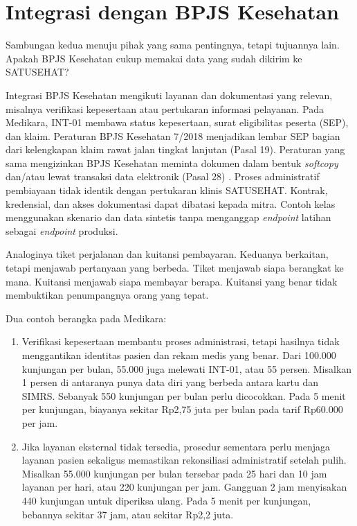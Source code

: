 \section{Integrasi dengan BPJS Kesehatan}

Sambungan kedua menuju pihak yang sama pentingnya, tetapi tujuannya lain. Apakah BPJS Kesehatan cukup memakai data
yang sudah dikirim ke SATUSEHAT?

Integrasi BPJS Kesehatan mengikuti layanan dan dokumentasi yang relevan, misalnya verifikasi kepesertaan atau
pertukaran informasi pelayanan. Pada Medikara, INT-01 membawa status kepesertaan, surat eligibilitas peserta (SEP),
dan klaim. Peraturan BPJS Kesehatan 7/2018 menjadikan lembar SEP bagian dari kelengkapan klaim rawat jalan tingkat
lanjutan (Pasal 19). Peraturan yang sama mengizinkan BPJS Kesehatan meminta dokumen dalam bentuk \textit{softcopy}
dan/atau lewat transaksi data elektronik (Pasal 28) \cite{c07-perban7-2018}. Proses administratif pembiayaan tidak
identik dengan pertukaran klinis SATUSEHAT. Kontrak, kredensial, dan akses dokumentasi dapat dibatasi kepada mitra.
Contoh kelas menggunakan skenario dan data sintetis tanpa menganggap \textit{endpoint} latihan sebagai
\textit{endpoint} produksi.

Analoginya tiket perjalanan dan kuitansi pembayaran. Keduanya berkaitan, tetapi menjawab pertanyaan yang berbeda.
Tiket menjawab siapa berangkat ke mana. Kuitansi menjawab siapa membayar berapa. Kuitansi yang benar tidak membuktikan
penumpangnya orang yang tepat.

Dua contoh berangka pada Medikara:
\begin{enumerate}
  \item Verifikasi kepesertaan membantu proses administrasi, tetapi hasilnya tidak menggantikan identitas pasien dan
        rekam medis yang benar. Dari 100.000 kunjungan per bulan, 55.000 juga melewati INT-01, atau 55 persen.
        Misalkan 1 persen di antaranya punya data diri yang berbeda antara kartu dan SIMRS. Sebanyak 550 kunjungan per
        bulan perlu dicocokkan. Pada 5 menit per kunjungan, biayanya sekitar Rp2,75 juta per bulan pada tarif Rp60.000
        per jam.
  \item Jika layanan eksternal tidak tersedia, prosedur sementara perlu menjaga layanan pasien sekaligus memastikan
        rekonsiliasi administratif setelah pulih. Misalkan 55.000 kunjungan per bulan tersebar pada 25 hari dan 10 jam
        layanan per hari, atau 220 kunjungan per jam. Gangguan 2 jam menyisakan 440 kunjungan untuk diperiksa ulang.
        Pada 5 menit per kunjungan, bebannya sekitar 37 jam, atau sekitar Rp2,2 juta.
\end{enumerate}

